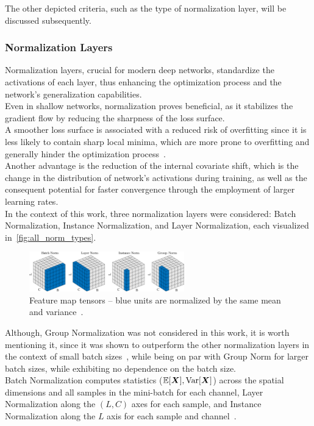 The other depicted criteria, such as the type of normalization layer, will be discussed subsequently.

\subsubsection{Normalization Layers}
Normalization layers, crucial for modern deep networks, standardize the activations of each layer,
thus enhancing the optimization process and the network's generalization capabilities. \\
Even in shallow networks, normalization proves beneficial, as it stabilizes the gradient flow by reducing the sharpness
of the loss surface. \\
A smoother loss surface is associated with a reduced risk of overfitting since it is less likely
to contain sharp local minima, which are more prone to overfitting and generally hinder the optimization process~\cite{lyu2023norm}.\\
Another advantage is the reduction of the internal covariate shift, which is the change in the distribution of network's activations during training, as
well as the consequent potential for faster convergence through the employment of larger learning rates. \\

In the context of this work, three normalization layers were considered: Batch Normalization, Instance Normalization,
and Layer Normalization, each visualized in~\autoref{fig:all_norm_types}.

\begin{figure}[H]
    \centering
    \includegraphics[width=0.6\textwidth]{figures/06_ModelExploration/4_CNN/all_norms.pdf}
    \caption{Feature map tensors -- blue units are normalized by the same mean and variance~\cite{wu2018group}.}
    \label{fig:all_norm_types}
\end{figure}

Although, Group Normalization was not considered in this work, it is worth mentioning it, since it was shown to outperform
the other normalization layers in the context of small batch sizes~\cite{wu2018group}, while being on par with Group Norm for larger batch
sizes, while exhibiting no dependence on the batch size. \\
Batch Normalization computes statistics (\(\mathbb{E}[\boldsymbol{X}], \operatorname{Var}[\boldsymbol{X}]\)) across the spatial
dimensions and all samples in the mini-batch for each channel, Layer Normalization along the \((L, C)\) axes for each
sample, and Instance Normalization along the \(L\) axis for each sample and channel~\cite{wu2018group}.

